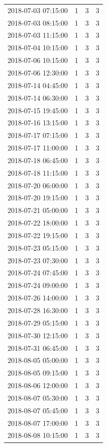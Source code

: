 \begin{tabular}{lrrr}
2018-07-03 07:15:00 & 1 & 3 & 3 \\
2018-07-03 08:15:00 & 1 & 3 & 3 \\
2018-07-03 11:15:00 & 1 & 3 & 3 \\
2018-07-04 10:15:00 & 1 & 3 & 3 \\
2018-07-06 10:15:00 & 1 & 3 & 3 \\
2018-07-06 12:30:00 & 1 & 3 & 3 \\
2018-07-14 04:45:00 & 1 & 3 & 3 \\
2018-07-14 06:30:00 & 1 & 3 & 3 \\
2018-07-15 19:45:00 & 1 & 3 & 3 \\
2018-07-16 13:15:00 & 1 & 3 & 3 \\
2018-07-17 07:15:00 & 1 & 3 & 3 \\
2018-07-17 11:00:00 & 1 & 3 & 3 \\
2018-07-18 06:45:00 & 1 & 3 & 3 \\
2018-07-18 11:15:00 & 1 & 3 & 3 \\
2018-07-20 06:00:00 & 1 & 3 & 3 \\
2018-07-20 19:15:00 & 1 & 3 & 3 \\
2018-07-21 05:00:00 & 1 & 3 & 3 \\
2018-07-22 18:00:00 & 1 & 3 & 3 \\
2018-07-22 19:15:00 & 1 & 3 & 3 \\
2018-07-23 05:15:00 & 1 & 3 & 3 \\
2018-07-23 07:30:00 & 1 & 3 & 3 \\
2018-07-24 07:45:00 & 1 & 3 & 3 \\
2018-07-24 09:00:00 & 1 & 3 & 3 \\
2018-07-26 14:00:00 & 1 & 3 & 3 \\
2018-07-28 16:30:00 & 1 & 3 & 3 \\
2018-07-29 05:15:00 & 1 & 3 & 3 \\
2018-07-30 12:15:00 & 1 & 3 & 3 \\
2018-07-31 06:45:00 & 1 & 3 & 3 \\
2018-08-05 05:00:00 & 1 & 3 & 3 \\
2018-08-05 09:15:00 & 1 & 3 & 3 \\
2018-08-06 12:00:00 & 1 & 3 & 3 \\
2018-08-07 05:30:00 & 1 & 3 & 3 \\
2018-08-07 05:45:00 & 1 & 3 & 3 \\
2018-08-07 17:00:00 & 1 & 3 & 3 \\
2018-08-08 10:15:00 & 1 & 3 & 3 \\

\end{tabular}
